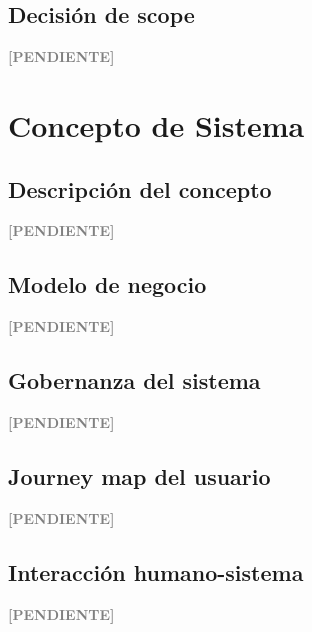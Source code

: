 \documentclass[12pt,a4paper]{article}
\newenvironment{pendiente}
  {\par\vspace{4pt}\noindent\textcolor{gray}{\textbf{[PENDIENTE]}}\par\begingroup\color{gray}\small}
  {\endgroup\par\vspace{4pt}}
\begin{document}
\subsection{Decisión de scope}
\begin{pendiente}
\end{pendiente}



\section{Concepto de Sistema}

\subsection{Descripción del concepto}
\begin{pendiente}
\end{pendiente}

\subsection{Modelo de negocio}
\begin{pendiente}
\end{pendiente}

\subsection{Gobernanza del sistema}
\begin{pendiente}
\end{pendiente}

\subsection{Journey map del usuario}
\begin{pendiente}
\end{pendiente}

\subsection{Interacción humano-sistema}
\begin{pendiente}
\end{pendiente}


\end{document}
